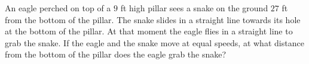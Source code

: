 An eagle perched on top of a $9$ ft high pillar sees a snake on the ground $27$ ft from the bottom of the pillar. The snake slides in a straight line towards its hole at the bottom of the pillar. At that moment the eagle flies in a straight line to grab the snake. If the eagle and the snake move at equal speeds, at what distance from the bottom of the pillar does the eagle grab the snake?
